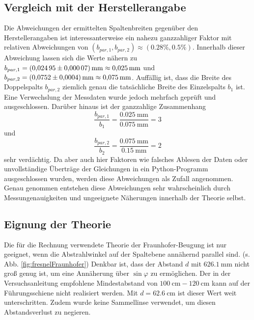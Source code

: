 \subsection{Vergleich mit der Herstellerangabe}
Die Abweichungen der ermittelten Spaltenbreiten gegenüber den Herstellerangaben ist interessanterweise ein nahezu ganzzahliger Faktor mit relativen Abweichungen von
$(b_{par, 1}, b_{par, 2}) \approx (0.28\%, 0.5\%)$. Innerhalb dieser Abweichung lassen sich die Werte nähern zu $b_{par, 1} = \SI{0.02495 \pm 0.00007}{\milli\meter} \approx \SI{0.025}{\milli\meter}$ und
$b_{par, 2} = \SI{0.0752 \pm 0.0004}{\milli\meter} \approx \SI{0.075}{\milli\meter}$.
Auffällig ist, dass die Breite des Doppelspalts $b_{par, 2}$ ziemlich genau die tatsächliche Breite des Einzelspalts $b_1$ ist.
Eine Verwechslung der Messdaten wurde jedoch mehrfach geprüft und ausgeschlossen.
Darüber hinaus ist der ganzzahlige Zusammenhang 
\begin{equation*}
    \dfrac{b_{par, 1}}{b_1} = \dfrac{\SI{0.025}{\milli\meter}}{\SI{0.075}{\milli\meter}} = 3
\end{equation*}
und
\begin{equation*}
    \dfrac{b_{par, 2}}{b_2} = \dfrac{\SI{0.075}{\milli\meter}}{\SI{0.15}{\milli\meter}} = 2
\end{equation*}
sehr verdächtig. Da aber auch hier Faktoren wie falsches Ablesen der Daten oder unvollständige Überträge der Gleichungen in ein Python-Programm ausgeschlossen wurden,
werden diese Abweichungen als Zufall angenommen.
Genau genommen entstehen diese Abweichungen sehr wahrscheinlich durch Messungenauigkeiten und ungeeignete Näherungen innerhalb der Theorie selbst. \\

\subsection{Eignung der Theorie}
Die für die Rechnung verwendete Theorie der Fraunhofer-Beugung ist nur geeignet, wenn die Abstrahlwinkel auf der Spaltebene annähernd parallel sind. (s. Abb. \ref{fig:fresnelFraunhofer})
Denkbar ist, dass der Abstand $d$ mit $\SI{626.1}{\milli\meter}$ nicht groß genug ist, um eine Annäherung über $\sin{\varphi}$ zu ermöglichen.
Der in der Versuchsanleitung empfohlene Mindestabstand von $\SI{100}{\centi\meter} - \SI{120}{\centi\meter}$ kann auf der Führungsschiene nicht realisiert werden.
Mit $d = \SI{62.6}{\centi\meter}$ ist dieser Wert weit unterschritten. Zudem wurde keine Sammellinse verwendet, um diesen Abstandsverlust zu negieren.


